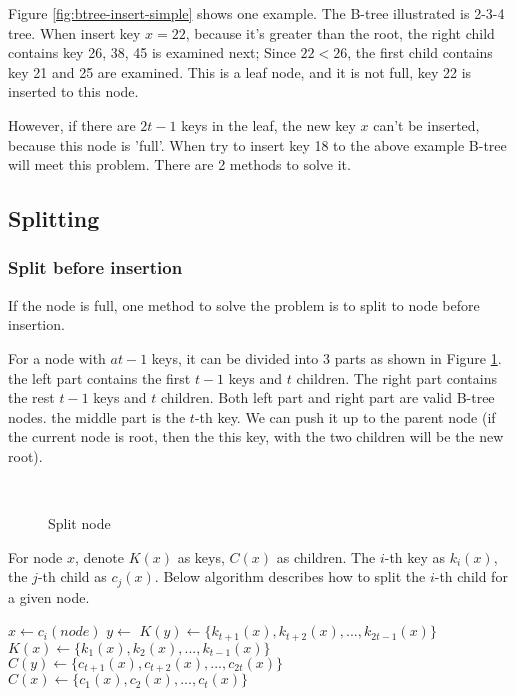 \documentclass{article}
\begin{document}
Figure \ref{fig:btree-insert-simple} shows one example. The B-tree illustrated
is 2-3-4 tree. When insert key $x=22$, because it's greater than the root,
the right child contains key 26, 38, 45 is examined next; Since $22 < 26$,
the first child contains key 21 and 25 are examined. This is a leaf
node, and it is not full, key 22 is inserted to this node.

However, if there are $2t-1$ keys in the leaf, the new key $x$ can't
be inserted, because this node is 'full'. When try to insert key 18
to the above example B-tree will meet this problem. There are 2 methods to
solve it.

\subsection{Splitting}
\label{split}

\subsubsection{Split before insertion}

If the node is full, one method to solve the problem is to
split to node before insertion.

For a node with $at-1$ keys, it can be divided into 3 parts as shown in
Figure \ref{fig:node-split}. the left part contains the first $t-1$ keys
and $t$ children. The right part contains the rest $t-1$ keys
and $t$ children. Both left part and right part are valid B-tree
nodes. the middle part is the $t$-th key. We can push it up
to the parent node (if the current node is root, then the this key,
with the two children will be the new root).

\begin{figure}[htbp]
  \centering
   \\
  \caption{Split node}
  \label{fig:node-split}
\end{figure}

For node $x$, denote $K(x)$
as keys, $C(x)$ as children. The $i$-th key as $k_i(x)$, the $j$-th child
as $c_j(x)$. Below algorithm describes how to split the $i$-th child for a given node.

\begin{algorithmic}[1]
  \State $x \gets c_i(node)$
  \State $y \gets$ 
  \State {}
  \State {}
  \State $K(y) \gets \{k_{t+1}(x), k_{t+2}(x), ..., k_{2t-1}(x)\}$
  \State $K(x) \gets \{k_1(x), k_2(x), ..., k_{t-1}(x)\}$
    \State $C(y) \gets \{c_{t+1}(x), c_{t+2}(x), ..., c_{2t}(x)\}$
    \State $C(x) \gets \{c_1(x), c_2(x), ..., c_t(x)\}$
  \EndIf
\EndProcedure
\end{algorithmic}
\end{document}
